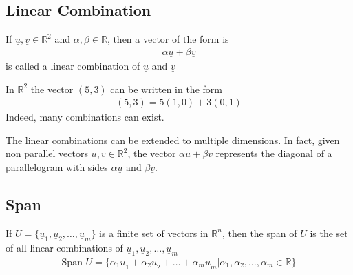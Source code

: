 \documentclass[a4paper]{article}
\theoremstyle{plain}
\theoremstyle{definition}
\newtheorem{defn}{Definition}[section]
\newtheorem{exmp}{Example}[section]
\theoremstyle{remark}
\begin{document}
\subsection{Linear Combination}
\begin{tcolorbox}[colback=black!3!white,colframe=black!60!white,title=\begin{defn}Linear Combination \label{Linear Combination}\end{defn}]
If $\underline{u},\underline{v} \in \mathbb{R}^2$ and $\alpha,\beta \in \mathbb{R}$, then a vector of the form is
\begin{align}
\alpha \underline{u} + \beta \underline{v}
\end{align}
is called a linear combination of $\underline{u}$ and $\underline{v}$
\end{tcolorbox}
\begin{tcolorbox}[colback=black!3!white,colframe=black!60!white,title=\begin{exmp}Example 1: Linear Combination \label{Example 1: Linear Combination}\end{exmp}]
        In $\mathbb{R}^2$ the vector $(5,3)$ can be written in the form
	\begin{align*}
		  (5,3) = 5(1,0) + 3(0,1)
	\end{align*}
	Indeed, many combinations can exist.
\end{tcolorbox}
The linear combinations can be extended to multiple dimensions. In fact, given non parallel vectors $\underline{u},\underline{v} \in \mathbb{R}^2$, the vector $ \alpha \underline{u}+ \beta \underline{v}$ represents the diagonal of a parallelogram with sides $\alpha \underline{u}$ and $\beta \underline{v}$.
\subsection{Span}
\begin{tcolorbox}[colback=black!3!white,colframe=black!60!white,title=\begin{defn}Span \label{Span}\end{defn}]
If $U = \{\underline{u}_1, \underline{u}_2,\ldots,\underline{u}_m \}$ is a finite set of vectors in $\mathbb{R}^{n}$, then the span of $U$ is the set of all linear combinations of $\underline{u}_1, \underline{u}_2,\ldots,\underline{u}_m $
\begin{align}
\text{Span } U = \{ \alpha_1 \underline{u}_1+\alpha_2\underline{u}_2 + \ldots + \alpha_m \underline{u}_m | \alpha_1, \alpha_2,\ldots,\alpha_m \in \mathbb{R} \}
\end{align}
\end{tcolorbox}
\end{document}
